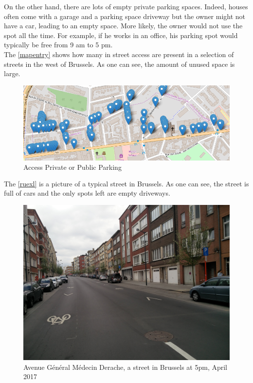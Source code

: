 \documentclass[12pt,a4paper,oneside]{book}
\begin{document}
On the other hand, there are lots of empty private parking spaces. Indeed, houses often come with a garage and a parking space driveway but the owner might not have a car, leading to an empty space. More likely, the owner would not use the spot all the time. For example, if he works in an office, his parking spot would typically be free from 9 am to 5 pm.\\
The \autoref{mapentry} shows how many in street access are present in a selection of streets in the west of Brussels. As one can see, the amount of unused space is large.\\


\begin{figure}[h]
\centering
\caption{Access Private or Public Parking\cite{mapentrysrc}}
\label{mapentry}
\includegraphics[keepaspectratio=true,width=\textwidth-2cm]{../images/casestudyander.png}
\end{figure}

The \autoref{ruexl} is a picture of a typical street in Brussels. As one can see, the street is full of cars and the only spots left are empty driveways.

\begin{figure}[h]
\centering
\caption{Avenue Général Médecin Derache, a street in Brussels at 5pm, April 2017}
\label{ruexl}
\includegraphics[keepaspectratio=true,width=\textwidth-2cm]{../images/ruexl.jpg}
\end{figure}
\end{document}
